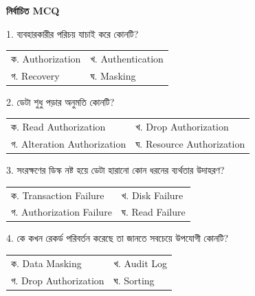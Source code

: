 \textbf{নির্বাচিত MCQ}
\begin{chSixSideBySide}[.48]
\small 1. ব্যবহারকারীর পরিচয় যাচাই করে কোনটি?

\par
\begin{tabularx}{\linewidth}{@{}Y Y@{}}
ক. Authorization & খ. Authentication \\
গ. Recovery & ঘ. Masking \\
\end{tabularx}
\smallskip
{}
\chSixNextColumn
\small 2. ডেটা শুধু পড়ার অনুমতি কোনটি?

\par
\begin{tabularx}{\linewidth}{@{}Y Y@{}}
ক. Read Authorization & খ. Drop Authorization \\
গ. Alteration Authorization & ঘ. Resource Authorization \\
\end{tabularx}
\smallskip
{}
\end{chSixSideBySide}
\begin{chSixSideBySide}[.48]
\small 3. সংরক্ষণের ডিস্ক নষ্ট হয়ে ডেটা হারানো কোন ধরনের ব্যর্থতার উদাহরণ?

\par
\begin{tabularx}{\linewidth}{@{}Y Y@{}}
ক. Transaction Failure & খ. Disk Failure \\
গ. Authorization Failure & ঘ. Read Failure \\
\end{tabularx}
\smallskip
{}
\chSixNextColumn
\small 4. কে কখন রেকর্ড পরিবর্তন করেছে তা জানতে সবচেয়ে উপযোগী কোনটি?

\par
\begin{tabularx}{\linewidth}{@{}Y Y@{}}
ক. Data Masking & খ. Audit Log \\
গ. Drop Authorization & ঘ. Sorting \\
\end{tabularx}
\smallskip
{}
\end{chSixSideBySide}



